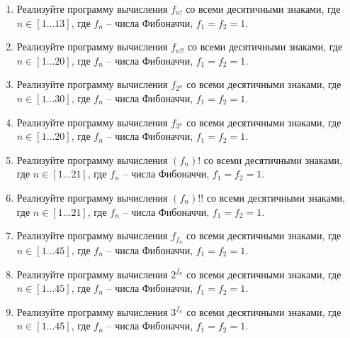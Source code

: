 \begin{enumerate}
	\item Реализуйте программу вычисления $f_{n!}$ со всеми десятичными знаками, где $n\in [1\dots 13]$, где $f_n$ -- числа Фибоначчи, $f_1=f_2=1$.

	\item Реализуйте программу вычисления $f_{n!!}$ со всеми десятичными знаками, где $n\in [1\dots 20]$, где $f_n$ -- числа Фибоначчи, $f_1=f_2=1$.

	\item Реализуйте программу вычисления $f_{2^n}$ со всеми десятичными знаками, где $n\in [1\dots 30]$, где $f_n$ -- числа Фибоначчи, $f_1=f_2=1$.

	\item Реализуйте программу вычисления $f_{3^n}$ со всеми десятичными знаками, где $n\in [1\dots 20]$, где $f_n$ -- числа Фибоначчи, $f_1=f_2=1$.

	\item Реализуйте программу вычисления $(f_n)!$ со всеми десятичными знаками, где $n\in [1\dots 21]$, где $f_n$ -- числа Фибоначчи, $f_1=f_2=1$.

	\item Реализуйте программу вычисления $(f_n)!!$ со всеми десятичными знаками, где $n\in [1\dots 21]$, где $f_n$ -- числа Фибоначчи, $f_1=f_2=1$.

	\item Реализуйте программу вычисления $f_{f_n}$ со всеми десятичными знаками, где $n\in [1\dots 45]$, где $f_n$ -- числа Фибоначчи, $f_1=f_2=1$.
		
	\item Реализуйте программу вычисления $2^{f_n}$ со всеми десятичными знаками, где $n\in [1\dots 45]$, где $f_n$ -- числа Фибоначчи, $f_1=f_2=1$.

	\item Реализуйте программу вычисления $3^{f_n}$ со всеми десятичными знаками, где $n\in [1\dots 45]$, где $f_n$ -- числа Фибоначчи, $f_1=f_2=1$.

\end{enumerate}

